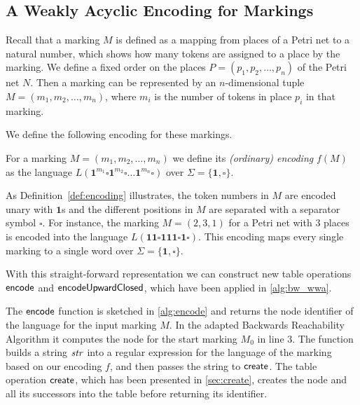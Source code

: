 \subsection{A Weakly Acyclic Encoding for Markings}
Recall that a marking $M$ is defined as a mapping from places of a Petri net to a natural number, which shows how many tokens are assigned to a place by the marking. 
We define a fixed order on the places $P = (p_{1},p_{2},\dots,p_{n})$ of the Petri net $N$. Then a marking can be represented by an $n$-dimensional tuple $M = (m_{1},m_{2},\dots,m_{n})$, where $m_{i}$ is the number of tokens in place $p_{i}$ in that marking.

\par 

We define the following encoding for these markings.

\begin{definition}\label{def:encoding}
For a marking $M = (m_{1},m_{2},\dots,m_{n})$ we define its \emph{(ordinary) encoding} $f(M)$ as the language $L(\bm{1}^{m_{1}} \square \bm{1}^{m_{2}} \square \ldots \bm{1}^{m_{n}} \square)$ over $\Sigma = \{\bm{1}, \square\}$.
\end{definition}


As Definition~\autoref{def:encoding} illustrates, the token numbers in $M$ are encoded unary with $\bm{1}$s and the different positions in $M$ are separated with a separator symbol $\square$. For instance, the marking $M = (2,3,1)$ for a Petri net with 3 places is encoded into the language $L(\bm{11 \square 111 \square 1 \square})$. This encoding maps every single marking to a single word over $\Sigma = \{\bm{1}, \square\}$.
\par 
With this straight-forward representation we can construct new table operations $\operatorname{\textsf{encode}}$ and $\operatorname{\textsf{encodeUpwardClosed}}$, which have been applied in \autoref{alg:bw_wwa}. 
\par
The $\operatorname{\textsf{encode}}$ function is sketched in \autoref{alg:encode} and returns the node identifier of the language for the input marking $M$. In the adapted Backwards Reachability Algorithm it computes the node for the start marking $M_{0}$ in line 3. The function builds a string $\mathit{str}$ into a regular expression for the language of the marking based on our encoding $f$, and then passes the string to $\operatorname{\textsf{create}}$. The table operation $\operatorname{\textsf{create}}$, which has been presented in \autoref{sec:create}, creates the node and all its successors into the table before returning its identifier.

